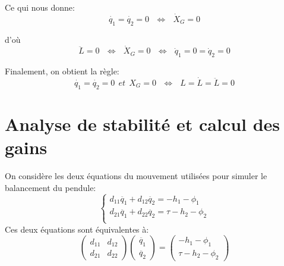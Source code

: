 \documentclass[a4paper,12pt]{report}
\begin{document}
Ce qui nous donne:
$$\dot{q_1} = \dot{q_2} = 0 \ \ \ \Leftrightarrow \ \ \ \dot{X}_G = 0$$

d'où
$$
 \ddot{L} = 0 \ \ \ \Leftrightarrow \ \ \ \dot{X}_G = 0 \ \ \ \Leftrightarrow \ \ \  \dot{q}_1 = 0 =\dot{q}_2 = 0
$$

Finalement, on obtient la règle:
$$\dot{q_1} = \dot{q_2} = 0 \ \ et  \ \ X_G = 0  \ \ \ \Leftrightarrow \ \ \ L = \dot{L} = \ddot{L} = 0$$


\section*{Analyse de stabilité et calcul des gains}
On considère les deux équations du mouvement utilisées pour simuler le balancement du pendule:
$$
\left\{
    \begin{array}{ll}
        d_{11}\ddot{q_1} + d_{12}\ddot{q_2} = -h_1 - \phi_1  \\
        d_{21}\ddot{q_1} + d_{22}\ddot{q_2} = \tau -h_2 - \phi_2  \\
    \end{array}
\right.
$$
Ces deux équations sont équivalentes à:
$$
    \begin{pmatrix}
    d_{11} & d_{12} \\
    d_{21} & d_{22}
    \end{pmatrix}
    \begin{pmatrix}
    \ddot{q_1} \\
    \ddot{q_2}
    \end{pmatrix}
    =
    \begin{pmatrix}
    -h_1 - \phi_1 \\
    \tau -h_2 - \phi_2
    \end{pmatrix}
$$
\end{document}
